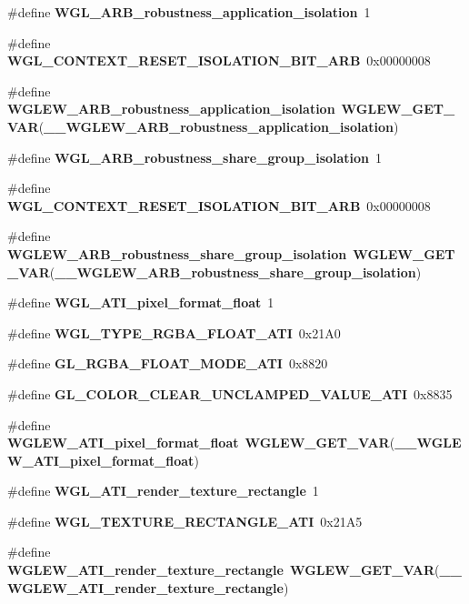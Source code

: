 \begin{DoxyCompactItemize}
\item 
\#define {\bf W\+G\+L\+\_\+\+A\+R\+B\+\_\+robustness\+\_\+application\+\_\+isolation}~1
\item 
\#define {\bf W\+G\+L\+\_\+\+C\+O\+N\+T\+E\+X\+T\+\_\+\+R\+E\+S\+E\+T\+\_\+\+I\+S\+O\+L\+A\+T\+I\+O\+N\+\_\+\+B\+I\+T\+\_\+\+A\+RB}~0x00000008
\item 
\#define {\bf W\+G\+L\+E\+W\+\_\+\+A\+R\+B\+\_\+robustness\+\_\+application\+\_\+isolation}~{\bf W\+G\+L\+E\+W\+\_\+\+G\+E\+T\+\_\+\+V\+AR}({\bf \+\_\+\+\_\+\+W\+G\+L\+E\+W\+\_\+\+A\+R\+B\+\_\+robustness\+\_\+application\+\_\+isolation})
\item 
\#define {\bf W\+G\+L\+\_\+\+A\+R\+B\+\_\+robustness\+\_\+share\+\_\+group\+\_\+isolation}~1
\item 
\#define {\bf W\+G\+L\+\_\+\+C\+O\+N\+T\+E\+X\+T\+\_\+\+R\+E\+S\+E\+T\+\_\+\+I\+S\+O\+L\+A\+T\+I\+O\+N\+\_\+\+B\+I\+T\+\_\+\+A\+RB}~0x00000008
\item 
\#define {\bf W\+G\+L\+E\+W\+\_\+\+A\+R\+B\+\_\+robustness\+\_\+share\+\_\+group\+\_\+isolation}~{\bf W\+G\+L\+E\+W\+\_\+\+G\+E\+T\+\_\+\+V\+AR}({\bf \+\_\+\+\_\+\+W\+G\+L\+E\+W\+\_\+\+A\+R\+B\+\_\+robustness\+\_\+share\+\_\+group\+\_\+isolation})
\item 
\#define {\bf W\+G\+L\+\_\+\+A\+T\+I\+\_\+pixel\+\_\+format\+\_\+float}~1
\item 
\#define {\bf W\+G\+L\+\_\+\+T\+Y\+P\+E\+\_\+\+R\+G\+B\+A\+\_\+\+F\+L\+O\+A\+T\+\_\+\+A\+TI}~0x21\+A0
\item 
\#define {\bf G\+L\+\_\+\+R\+G\+B\+A\+\_\+\+F\+L\+O\+A\+T\+\_\+\+M\+O\+D\+E\+\_\+\+A\+TI}~0x8820
\item 
\#define {\bf G\+L\+\_\+\+C\+O\+L\+O\+R\+\_\+\+C\+L\+E\+A\+R\+\_\+\+U\+N\+C\+L\+A\+M\+P\+E\+D\+\_\+\+V\+A\+L\+U\+E\+\_\+\+A\+TI}~0x8835
\item 
\#define {\bf W\+G\+L\+E\+W\+\_\+\+A\+T\+I\+\_\+pixel\+\_\+format\+\_\+float}~{\bf W\+G\+L\+E\+W\+\_\+\+G\+E\+T\+\_\+\+V\+AR}({\bf \+\_\+\+\_\+\+W\+G\+L\+E\+W\+\_\+\+A\+T\+I\+\_\+pixel\+\_\+format\+\_\+float})
\item 
\#define {\bf W\+G\+L\+\_\+\+A\+T\+I\+\_\+render\+\_\+texture\+\_\+rectangle}~1
\item 
\#define {\bf W\+G\+L\+\_\+\+T\+E\+X\+T\+U\+R\+E\+\_\+\+R\+E\+C\+T\+A\+N\+G\+L\+E\+\_\+\+A\+TI}~0x21\+A5
\item 
\#define {\bf W\+G\+L\+E\+W\+\_\+\+A\+T\+I\+\_\+render\+\_\+texture\+\_\+rectangle}~{\bf W\+G\+L\+E\+W\+\_\+\+G\+E\+T\+\_\+\+V\+AR}({\bf \+\_\+\+\_\+\+W\+G\+L\+E\+W\+\_\+\+A\+T\+I\+\_\+render\+\_\+texture\+\_\+rectangle})

\end{DoxyCompactItemize}
